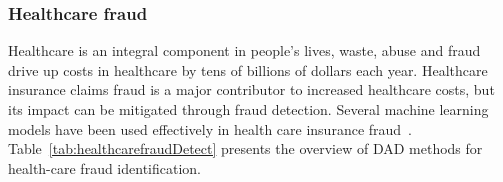 \subsubsection{Healthcare fraud}

Healthcare is an integral component in people's lives, waste, abuse and fraud drive up costs in healthcare by tens of billions of dollars each year. Healthcare insurance claims fraud is a major contributor to increased healthcare costs, but its impact can be mitigated through fraud detection. Several machine learning models have been used effectively in health care insurance fraud~\cite{bauder2017medicare}.
Table~\ref{tab:healthcarefraudDetect} presents the overview of DAD methods for health-care fraud identification.


\begin{table}
\begin{center}
  \caption{Examples of DAD techniques used in  healthcare fraud detection.
          \\RBM: Restricted Botlzmann Machines, GAN: Generative Adversarial Networks}
  \captionsetup{justification=centering}
  \label{tab:healthcarefraudDetect}
\end{center}
\end{table}
